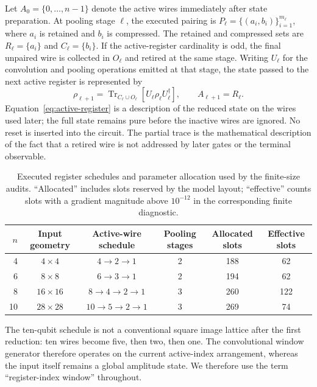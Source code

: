 \documentclass[conference]{IEEEtran}
\begin{document}
Let $A_0=\{0,\ldots,n-1\}$ denote the active wires immediately after state
preparation. At pooling stage $\ell$, the executed pairing is
$P_\ell=\{(a_i,b_i)\}_{i=1}^{m_\ell}$, where $a_i$ is retained and $b_i$ is
compressed. The retained and compressed sets are
$R_\ell=\{a_i\}$ and $C_\ell=\{b_i\}$. If the active-register cardinality is
odd, the final unpaired wire is collected in $O_\ell$ and retired at the same
stage. Writing $U_\ell$ for the convolution and pooling operations emitted at
that stage, the state passed to the next active register is represented by
\begin{equation}
\rho_{\ell+1}=\operatorname{Tr}_{C_\ell\cup O_\ell}
\!\left[U_\ell\rho_\ell U_\ell^{\dagger}\right],
\qquad A_{\ell+1}=R_\ell.
\label{eq:active-register}
\end{equation}
Equation~\eqref{eq:active-register} is a description of the reduced state on
the wires used later; the full state remains pure before the inactive wires are
ignored. No reset is inserted into the circuit. The partial trace is
the mathematical description of the fact that a retired wire is not addressed
by later gates or the terminal observable.

\begin{table}[!t]
\caption{Executed register schedules and parameter allocation used by the finite-size audits. ``Allocated'' includes slots reserved by the model layout; ``effective'' counts slots with a gradient magnitude above $10^{-12}$ in the corresponding finite diagnostic.}
\label{tab:schedule}
\centering
\small
\begin{tabular}{@{}rccccc@{}}
\toprule
\textbf{$n$} & \textbf{Input geometry} & \textbf{Active-wire schedule} & \textbf{Pooling stages} & \textbf{Allocated slots} & \textbf{Effective slots} \\
\midrule
4 & $4\times4$ & $4\rightarrow2\rightarrow1$ & 2 & 188 & 62 \\
6 & $8\times8$ & $6\rightarrow3\rightarrow1$ & 2 & 194 & 62 \\
8 & $16\times16$ & $8\rightarrow4\rightarrow2\rightarrow1$ & 3 & 260 & 122 \\
10 & $28\times28$ & $10\rightarrow5\rightarrow2\rightarrow1$ & 3 & 269 & 74 \\
\bottomrule
\end{tabular}
\end{table}

The ten-qubit schedule is not a conventional square image lattice after the
first reduction: ten wires become five, then two, then one. The convolutional
window generator therefore operates on the current active-index arrangement,
whereas the input itself remains a global amplitude state. We therefore use the term ``register-index window'' throughout.
\end{document}
